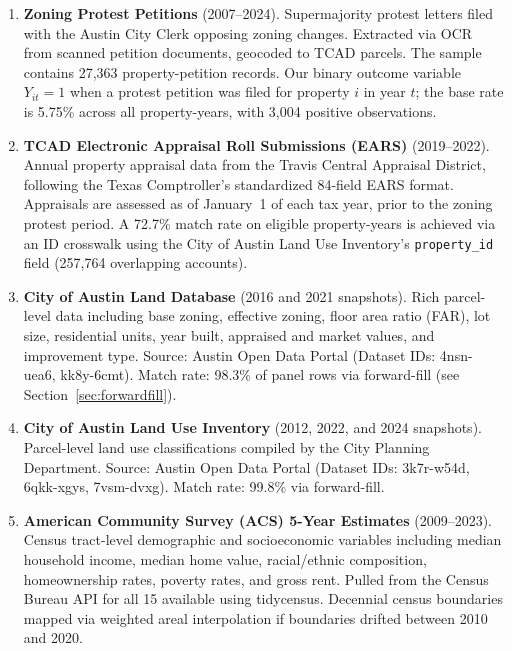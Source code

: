 \begin{enumerate}
 \item \textbf{Zoning Protest Petitions} (2007--2024). Supermajority protest letters filed
 with the Austin City Clerk opposing zoning changes.
 Extracted via OCR from scanned petition documents, geocoded to TCAD parcels.
 The sample contains 27,363 property-petition records. Our binary outcome variable
 $Y_{it} = 1$ when a protest petition was filed for property $i$ in year $t$; the
 base rate is 5.75\% across all property-years, with 3,004 positive observations.

 \item \textbf{TCAD Electronic Appraisal Roll Submissions (EARS)} (2019--2022).
 Annual property appraisal data from the Travis Central Appraisal District,
 following the Texas Comptroller's standardized 84-field EARS format.
 Appraisals are assessed as of January~1 of each tax year, prior to the zoning protest period.
 A 72.7\% match rate on eligible property-years is achieved via an ID crosswalk
 using the City of Austin Land Use Inventory's \texttt{property\_id} field
 (257,764 overlapping accounts).

 \item \textbf{City of Austin Land Database} (2016 and 2021 snapshots).
 Rich parcel-level data including base zoning, effective zoning, floor area ratio (FAR),
 lot size, residential units, year built, appraised and market values, and improvement type.
 Source: Austin Open Data Portal (Dataset IDs: 4nsn-uea6, kk8y-6cmt).
 Match rate: 98.3\% of panel rows via forward-fill (see Section~\ref{sec:forwardfill}).

 \item \textbf{City of Austin Land Use Inventory} (2012, 2022, and 2024 snapshots).
 Parcel-level land use classifications compiled by the City Planning Department.
 Source: Austin Open Data Portal (Dataset IDs: 3k7r-w54d, 6qkk-xgys, 7vsm-dvxg).
 Match rate: 99.8\% via forward-fill.

 \item \textbf{American Community Survey (ACS) 5-Year Estimates} (2009--2023).
 Census tract-level demographic and socioeconomic variables
 including median household income, median home value, racial/ethnic composition,
 homeownership rates, poverty rates, and gross rent.
 Pulled from the Census Bureau API for all 15 available using tidycensus. Decennial census boundaries mapped via weighted areal interpolation
 if boundaries drifted between 2010 and 2020.
\end{enumerate}

